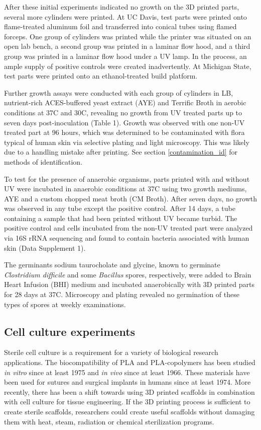 \documentclass[fleqn,10pt]{wlpeerj}
\begin{document}
After these initial experiments indicated no growth on the 3D printed parts,
several more cylinders were printed. At UC Davis, test parts were printed onto
flame-treated aluminum foil and transferred into conical tubes using flamed
forceps. One group of cylinders was printed while the printer was situated on
an open lab bench, a second group was printed in a laminar flow hood, and a
third group was printed in a laminar flow hood under a UV lamp. In the
process, an ample supply of positive controls were created inadvertently. At
Michigan State, test parts were printed onto an ethanol-treated build
platform.

Further growth assays were conducted with each group of cylinders in LB,
nutrient-rich ACES-buffered yeast extract (AYE) \cite{AYE_broth} and Terrific
Broth in aerobic conditions at 37C and 30C, revealing no growth from UV
treated parts up to seven days post-inoculation (Table 1). Growth was observed
with one non-UV treated part at 96 hours, which was determined to be
contaminated with flora typical of human skin via selective plating and light
microscopy. This was likely due to a handling mistake after printing. See
section \ref{contamination_id} for methods of identification.
 
To test for the presence of anaerobic organisms, parts printed with and
without UV were incubated in anaerobic conditions at 37C using two growth
mediums, AYE and a custom chopped meat broth (CM Broth).
\cite{seaweed_human_gut} After seven days, no growth was observed in any tube
except the positive control. After 14 days, a tube containing a sample that
had been printed without UV became turbid. The positive control and cells
incubated from the non-UV treated part were analyzed via 16S rRNA sequencing
and found to contain bacteria associated with human skin (Data Supplement 1).

The germinants sodium taurocholate and glycine, known to germinate {\em
Clostridium difficile} and some {\em Bacillus} spores, respectively,
\cite{spores, spore_germinant_salt} were added to Brain Heart Infusion (BHI)
medium and incubated anaerobically with 3D printed parts for 28 days at 37C.
Microscopy and plating revealed no germination of these types of spores at
weekly examinations.

\subsection{Cell culture experiments}

Sterile cell culture is a requirement for a variety of biological research
applications. The biocompatibility of PLA and PLA-copolymers has been studied
{\em in vitro} since at least 1975 \cite{PLA_1975} and {\em in vivo} since at
least 1966. \cite{PLA_1966} These materials have been used for sutures and
surgical implants in humans since at least 1974. \cite{Vicryl} More recently,
there has been a shift towards using 3D printed scaffolds in combination with
cell culture for tissue engineering. \cite{bone_printing} If the 3D printing
process is sufficient to create sterile scaffolds, researchers could create
useful scaffolds without damaging them with heat, steam, radiation or chemical
sterilization programs.
\end{document}
